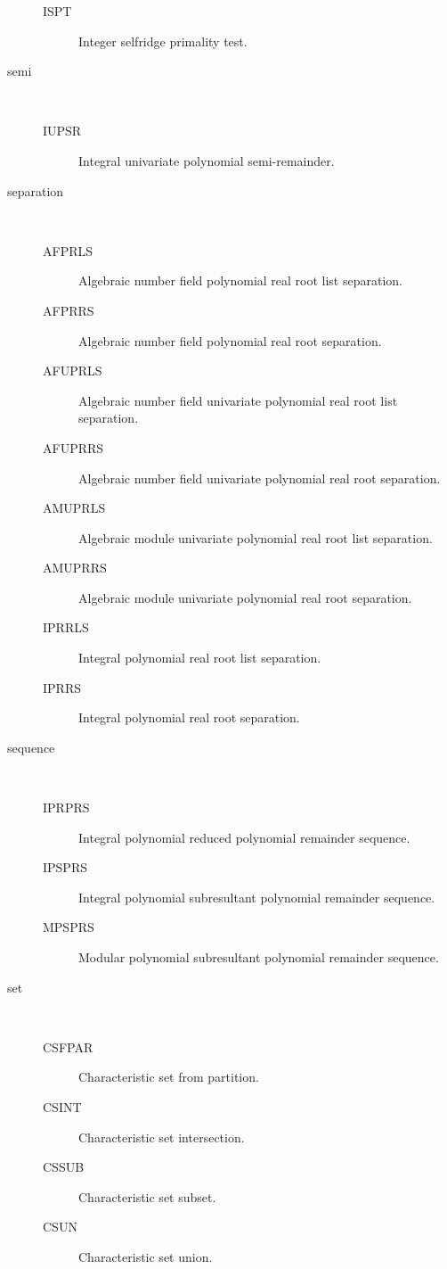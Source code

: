\begin{description}
  \begin{description}
  \item[ISPT]  Integer selfridge primality test.
  \end{description}
\item[semi] \ \ 
  \begin{description}
  \item[IUPSR]  Integral univariate polynomial semi-remainder.
  \end{description}
\item[separation] \ \ 
  \begin{description}
  \item[AFPRLS]  Algebraic number field polynomial real root list separation.
  \item[AFPRRS]  Algebraic number field polynomial real root separation.
  \item[AFUPRLS]  Algebraic number field univariate polynomial real root list
    separation.
  \item[AFUPRRS]  Algebraic number field univariate polynomial real root
    separation.
  \item[AMUPRLS]  Algebraic module univariate polynomial real root list
    separation.
  \item[AMUPRRS]  Algebraic module univariate polynomial real root separation.
  \item[IPRRLS]  Integral polynomial real root list separation.
  \item[IPRRS]  Integral polynomial real root separation.
  \end{description}
\item[sequence] \ \ 
  \begin{description}
  \item[IPRPRS]  Integral polynomial reduced polynomial remainder sequence.
  \item[IPSPRS]  Integral polynomial subresultant polynomial remainder
    sequence.
  \item[MPSPRS]  Modular polynomial subresultant polynomial remainder
    sequence.
  \end{description}
\item[set] \ \ 
  \begin{description}
  \item[CSFPAR]  Characteristic set from partition.
  \item[CSINT]  Characteristic set intersection.
  \item[CSSUB]  Characteristic set subset.
  \item[CSUN]  Characteristic set union.

\end{description}
\end{description}
